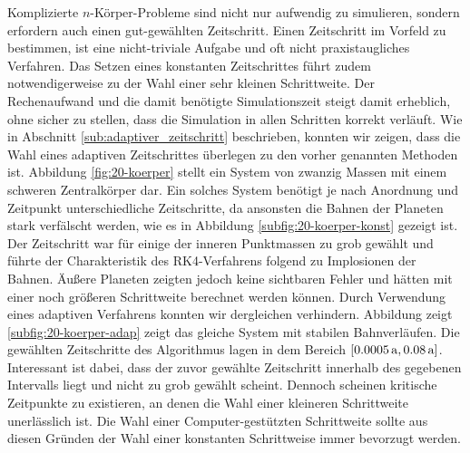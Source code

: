     Komplizierte $n$-Körper-Probleme sind nicht nur aufwendig zu simulieren, sondern erfordern auch einen gut-gewählten Zeitschritt.
    Einen Zeitschritt im Vorfeld zu bestimmen, ist eine nicht-triviale Aufgabe und oft nicht praxistaugliches Verfahren.
    Das Setzen eines konstanten Zeitschrittes führt zudem notwendigerweise zu der Wahl einer sehr kleinen Schrittweite.
    Der Rechenaufwand und die damit benötigte Simulationszeit steigt damit erheblich, ohne sicher zu stellen, dass die Simulation in allen Schritten korrekt verläuft.
    Wie in Abschnitt \ref{sub:adaptiver_zeitschritt} beschrieben, konnten wir zeigen, dass die Wahl eines adaptiven Zeitschrittes überlegen zu den vorher genannten Methoden ist.
    Abbildung \ref{fig:20-koerper} stellt ein System von zwanzig Massen mit einem schweren Zentralkörper dar.
    Ein solches System benötigt je nach Anordnung und Zeitpunkt unterschiedliche Zeitschritte, da ansonsten die Bahnen der Planeten stark verfälscht werden, wie es in Abbildung \ref{subfig:20-koerper-konst} gezeigt ist.
    Der Zeitschritt war für einige der inneren Punktmassen zu grob gewählt und führte der Charakteristik des RK4-Verfahrens folgend zu Implosionen der Bahnen.
    Äußere Planeten zeigten jedoch keine sichtbaren Fehler und hätten mit einer noch größeren Schrittweite berechnet werden können.
    Durch Verwendung eines adaptiven Verfahrens konnten wir dergleichen verhindern.
    Abbildung zeigt \ref{subfig:20-koerper-adap} zeigt das gleiche System mit stabilen Bahnverläufen.
    Die gewählten Zeitschritte des Algorithmus lagen in dem Bereich $[0.0005\,\mathrm{a},0.08\,\mathrm{a}]$.
    Interessant ist dabei, dass der zuvor gewählte Zeitschritt innerhalb des gegebenen Intervalls liegt und nicht zu grob gewählt scheint.
    Dennoch scheinen kritische Zeitpunkte zu existieren, an denen die Wahl einer kleineren Schrittweite unerlässlich ist.
    Die Wahl einer Computer-gestützten Schrittweite sollte aus diesen Gründen der Wahl einer konstanten Schrittweise immer bevorzugt werden.

